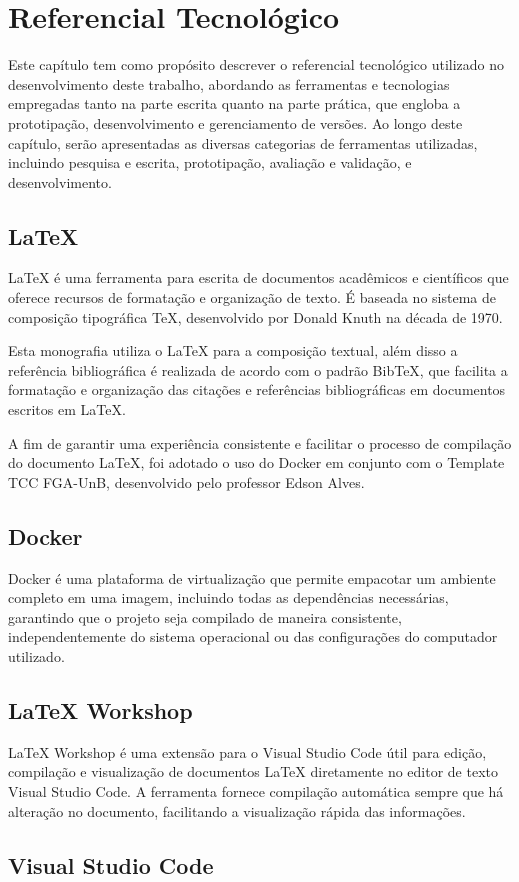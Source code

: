 \chapter[Referencial Tecnológico]{Referencial Tecnológico}

Este capítulo tem como propósito descrever o referencial tecnológico utilizado no 
desenvolvimento deste trabalho, abordando as ferramentas e tecnologias empregadas 
tanto na parte escrita quanto na parte prática, que engloba a prototipação, 
desenvolvimento e gerenciamento de versões. Ao longo deste capítulo, serão apresentadas 
as diversas categorias de ferramentas utilizadas, incluindo pesquisa e escrita, 
prototipação, avaliação e validação, e desenvolvimento.

\section{LaTeX}
\label{sec:Latex}
LaTeX \cite{latex} é uma ferramenta para escrita de documentos acadêmicos e científicos que oferece 
recursos de formatação e organização de texto. É baseada no sistema de composição tipográfica 
TeX, desenvolvido por Donald Knuth na década de 1970.

Esta monografia utiliza o LaTeX para a composição textual, além disso a referência bibliográfica 
é realizada de acordo com o padrão BibTeX, que facilita a formatação e organização das citações e 
referências bibliográficas em documentos escritos em LaTeX.

A fim de garantir uma experiência consistente e facilitar o processo de compilação do documento LaTeX, foi 
adotado o uso do Docker em conjunto com o Template TCC FGA-UnB, desenvolvido pelo professor 
Edson Alves. 

\section{Docker}
\label{sec:Docker}
Docker é uma plataforma de virtualização que permite empacotar um ambiente completo em 
uma imagem, incluindo todas as dependências necessárias, garantindo que o projeto seja 
compilado de maneira consistente, independentemente do sistema operacional ou das configurações do computador 
utilizado.

\section{LaTeX Workshop}
\label{sec:LaTeX Workshop}
LaTeX Workshop é uma extensão para o Visual Studio Code útil para edição, compilação e visualização de 
documentos LaTeX diretamente no editor de texto Visual Studio Code. A ferramenta fornece compilação 
automática sempre que há alteração no documento, facilitando a visualização rápida das informações.

\section{Visual Studio Code}
\label{sec:Visual Studio Code}